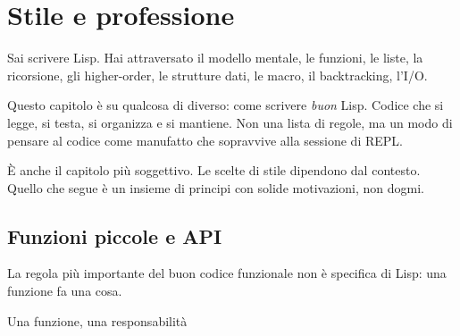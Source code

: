 
\chapter{Stile e professione}

\begin{intuizione}
Sai scrivere Lisp. Hai attraversato il modello mentale,
le funzioni, le liste, la ricorsione, gli higher-order,
le strutture dati, le macro, il backtracking, l'I/O.

\medskip
Questo capitolo è su qualcosa di diverso: come scrivere
\emph{buon} Lisp. Codice che si legge, si testa, si organizza
e si mantiene. Non una lista di regole, ma un modo di pensare
al codice come manufatto che sopravvive alla sessione di REPL.

\medskip
È anche il capitolo più soggettivo. Le scelte di stile
dipendono dal contesto. Quello che segue è un insieme
di principi con solide motivazioni, non dogmi.
\end{intuizione}

\vspace{4pt}

\section{Funzioni piccole e API}

La regola più importante del buon codice funzionale
non è specifica di Lisp: una funzione fa una cosa.

\begin{concetto}{Una funzione, una responsabilità}

\boxsep
{}
\end{concetto}

